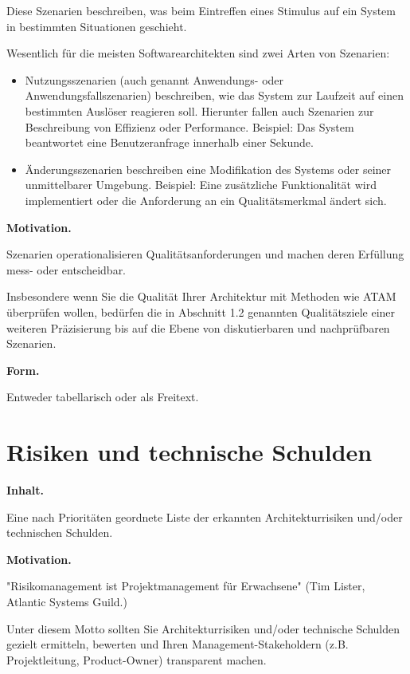 \documentclass[]{article}
\begin{document}
Diese Szenarien beschreiben, was beim Eintreffen eines Stimulus auf ein
System in bestimmten Situationen geschieht.

Wesentlich für die meisten Softwarearchitekten sind zwei Arten von
Szenarien:

\begin{itemize}
\item
  Nutzungsszenarien (auch genannt Anwendungs- oder
  Anwendungsfallszenarien) beschreiben, wie das System zur Laufzeit auf
  einen bestimmten Auslöser reagieren soll. Hierunter fallen auch
  Szenarien zur Beschreibung von Effizienz oder Performance. Beispiel:
  Das System beantwortet eine Benutzeranfrage innerhalb einer Sekunde.
\item
  Änderungsszenarien beschreiben eine Modifikation des Systems oder
  seiner unmittelbarer Umgebung. Beispiel: Eine zusätzliche
  Funktionalität wird implementiert oder die Anforderung an ein
  Qualitätsmerkmal ändert sich.
\end{itemize}

\textbf{Motivation.}

Szenarien operationalisieren Qualitätsanforderungen und machen deren
Erfüllung mess- oder entscheidbar.

Insbesondere wenn Sie die Qualität Ihrer Architektur mit Methoden wie
ATAM überprüfen wollen, bedürfen die in Abschnitt 1.2 genannten
Qualitätsziele einer weiteren Präzisierung bis auf die Ebene von
diskutierbaren und nachprüfbaren Szenarien.

\textbf{Form.}

Entweder tabellarisch oder als Freitext.

\section{Risiken und technische Schulden}\label{section-technical-risks}

\textbf{Inhalt.}

Eine nach Prioritäten geordnete Liste der erkannten Architekturrisiken
und/oder technischen Schulden.

\textbf{Motivation.}

"Risikomanagement ist Projektmanagement für Erwachsene" (Tim Lister,
Atlantic Systems Guild.)

Unter diesem Motto sollten Sie Architekturrisiken und/oder technische
Schulden gezielt ermitteln, bewerten und Ihren Management-Stakeholdern
(z.B. Projektleitung, Product-Owner) transparent machen.
\end{document}
